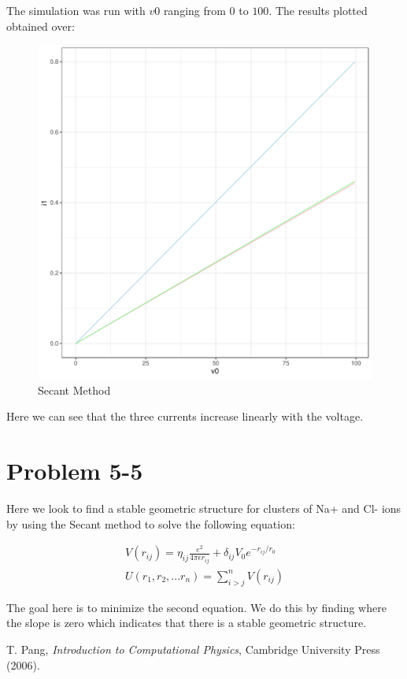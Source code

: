 \documentclass[prb,twocolumn]{revtex4-2}
\begin{document}
The simulation was run with $v0$ ranging from $0$ to $100$. The results plotted  obtained over:

\begin{figure}[h!]
\centerline{\includegraphics [width=3 in] {5-1}} \caption{Secant Method} \label{secant}
\end{figure}

Here we can see that the three currents increase linearly with the voltage. 

\section{Problem 5-5}

Here we look to find a stable geometric structure for clusters of Na+ and Cl- ions by using the Secant method to solve the following equation:

\begin{eqnarray}
V(r_{ij})=\eta_{ij}\frac{e^2}{4\pi\epsilon r_{ij}}+\delta_{ij}V_0e^{-r_{ij}/r_0} \\
  U(r_1, r_2, ... r_n) = \sum_{i>j}^{n}{V(r_{ij})}
\label{namefornewequation}
\end{eqnarray}

The goal here is to minimize the second equation. We do this by finding where the slope is zero which indicates that there is a stable geometric structure.

\begin{thebibliography}{99}

 T. Pang, \emph{Introduction to Computational Physics}, Cambridge University Press (2006).

\end{thebibliography}
\end{document}
